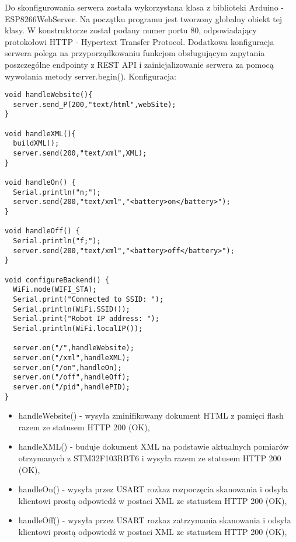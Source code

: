 \documentclass[a4paper,12pt,twoside,openany]{report}
\begin{document}
Do skonfigurowania serwera została wykorzystana klasa z biblioteki Arduino - ESP8266WebServer. Na początku programu jest tworzony globalny obiekt tej klasy. W konstruktorze został podany numer portu 80, odpowiadający protokołowi HTTP - Hypertext Transfer Protocol. Dodatkowa konfiguracja serwera polega na przyporządkowaniu funkcjom obsługującym zapytania poszczególne endpointy z REST API i zainicjalizowanie serwera za pomocą wywołania metody server.begin(). Konfiguracja:\\
\begin{lstlisting}[style=customcpp]
void handleWebsite(){
  server.send_P(200,"text/html",webSite);
}

void handleXML(){
  buildXML();
  server.send(200,"text/xml",XML);
}

void handleOn() {
  Serial.println("n;");
  server.send(200,"text/xml","<battery>on</battery>");
}

void handleOff() {
  Serial.println("f;");
  server.send(200,"text/xml","<battery>off</battery>");
}

void configureBackend() {
  WiFi.mode(WIFI_STA);
  Serial.print("Connected to SSID: ");
  Serial.println(WiFi.SSID());
  Serial.print("Robot IP address: ");
  Serial.println(WiFi.localIP());
  
  server.on("/",handleWebsite);
  server.on("/xml",handleXML);
  server.on("/on",handleOn);
  server.on("/off",handleOff);
  server.on("/pid",handlePID);
}  
\end{lstlisting}

\begin{itemize}
\item handleWebsite() - wysyła zminifikowany dokument HTML z pamięci flash razem ze statusem HTTP 200 (OK),
\item handleXML() - buduje dokument XML na podstawie aktualnych pomiarów otrzymanych z STM32F103RBT6 i wysyła razem ze statusem HTTP 200 (OK),
\item handleOn() - wysyła przez USART rozkaz rozpoczęcia skanowania i odsyła klientowi prostą odpowiedź w postaci XML ze statustem HTTP 200 (OK),
\item handleOff() - wysyła przez USART rozkaz zatrzymania skanowania i odsyła klientowi prostą odpowiedź w postaci XML ze statustem HTTP 200 (OK),
\end{itemize}
\end{document}

